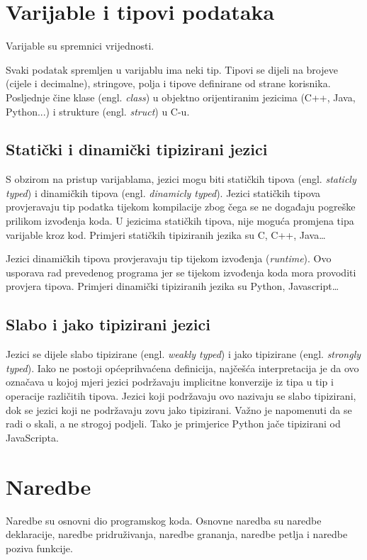 \documentclass[times, utf8, zavrsni]{fer}
\begin{document}
\section{Varijable i tipovi podataka}
Varijable su spremnici vrijednosti.

Svaki podatak spremljen u varijablu ima neki tip. Tipovi se dijeli na brojeve (cijele i decimalne), stringove, polja i tipove definirane od strane korisnika. Posljednje
čine klase (engl. \textit{class}) u objektno orijentiranim jezicima (C++, Java, Python...) i strukture (engl. \textit{struct}) u C-u.

\subsection{Statički i dinamički tipizirani jezici}
S obzirom na pristup varijablama, jezici mogu biti statičkih tipova (engl. \textit{staticly typed}) i dinamičkih tipova (engl. \textit{dinamicly typed}).
Jezici statičkih tipova provjeravaju tip podatka tijekom kompilacije zbog čega se ne događaju pogreške prilikom izvođenja koda. U jezicima statičkih tipova, nije moguća promjena tipa 
varijable kroz kod. Primjeri statičkih tipiziranih jezika su C, C++, Java\dots \citep{pythonplanet}

Jezici dinamičkih tipova provjeravaju tip tijekom izvođenja (\textit{runtime}). Ovo usporava rad prevedenog programa jer se tijekom izvođenja koda mora provoditi provjera tipova.
Primjeri dinamički tipiziranih jezika su Python, Javascript\dots \citep{pythonplanet}

\subsection{Slabo i jako tipizirani jezici}
Jezici se dijele slabo tipizirane (engl. \textit{weakly typed}) i jako tipizirane (engl. \textit{strongly typed}). Iako ne postoji općeprihvaćena definicija, 
najčešća interpretacija je da ovo označava u kojoj mjeri jezici podržavaju implicitne konverzije iz tipa u tip i operacije različitih tipova. Jezici koji podržavaju ovo nazivaju
se slabo tipizirani, dok se jezici koji ne podržavaju zovu jako tipizirani. Važno je napomenuti da se radi o skali, a ne strogoj podjeli. Tako je primjerice Python jače tipizirani od JavaScripta. \citep{zolatypes}

\section{Naredbe}
Naredbe su osnovni dio programskog koda. Osnovne naredba su naredbe deklaracije, naredbe pridruživanja, naredbe grananja, naredbe petlja i naredbe poziva funkcije.
\end{document}
